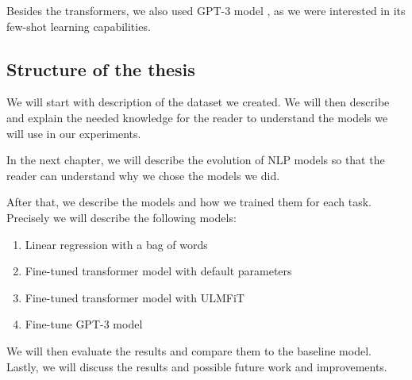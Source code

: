 Besides the transformers, we also used GPT-3 model \cite{brownLanguageModelsAre2020b},
as we were interested in its few-shot learning capabilities.

\subsection*{Structure of the thesis}
We will start with description of the dataset we created.
We will then describe and explain the needed knowledge for the reader to understand
the models we will use in our experiments.

In the next chapter, we will describe the evolution of NLP models so that the reader
can understand why we chose the models we did. 

After that, we describe the models and how we trained them for each task.
Precisely we will describe the following models:
\begin{enumerate}
    \item Linear regression with a bag of words 
    \item Fine-tuned transformer model with default parameters
    \item Fine-tuned transformer model with ULMFiT \cite{howardUniversalLanguageModel2018a}
    \item Fine-tune GPT-3 model \cite{brownLanguageModelsAre2020b}
\end{enumerate}
We will then evaluate the results and compare them to the baseline model.
Lastly, we will discuss the results and possible future work and improvements.